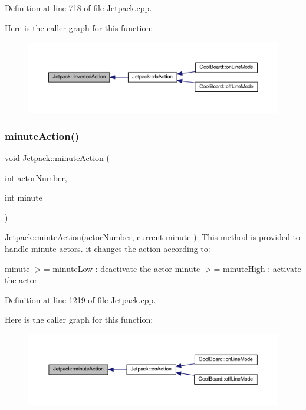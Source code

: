 Definition at line 718 of file Jetpack.\+cpp.

Here is the caller graph for this function\+:\nopagebreak
\begin{figure}[H]
\begin{center}
\leavevmode
\includegraphics[width=350pt]{class_jetpack_adacfc35fab4a621357caf98ce1c9cb54_icgraph}
\end{center}
\end{figure}
\mbox{\label{class_jetpack_a97da41141c7b53ddee61143519c8d17d}} 
\subsubsection{\texorpdfstring{minute\+Action()}{minuteAction()}}
{\footnotesize\ttfamily void Jetpack\+::minute\+Action (\begin{DoxyParamCaption}\item[{int}]{actor\+Number,  }\item[{int}]{minute }\end{DoxyParamCaption})}

Jetpack\+::minte\+Action(actor\+Number, current minute )\+: This method is provided to handle minute actors. it changes the action according to\+:

minute $>$= minute\+Low \+: deactivate the actor minute $>$= minute\+High \+: activate the actor 

Definition at line 1219 of file Jetpack.\+cpp.

Here is the caller graph for this function\+:\nopagebreak
\begin{figure}[H]
\begin{center}
\leavevmode
\includegraphics[width=350pt]{class_jetpack_a97da41141c7b53ddee61143519c8d17d_icgraph}
\end{center}
\end{figure}
\mbox{\label{class_jetpack_ac1a49ab4867718cdb415ad74c2066b9d}} 
